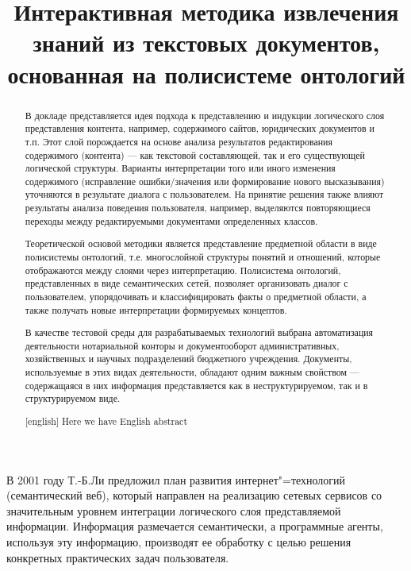 \documentclass[utf8]{../IncArticle}
\title{Интерактивная методика извлечения знаний из текстовых
  документов, основанная на полисистеме онтологий
  \e{Первоначальный заголовок: Методика ПРИОБРЕТЕНИЯ знаний из
    текстовых документов, основанная на анализе ответов пользователя и
    полисистемы онтологий}
}
\date{}
\begin{document}
\begin{abstract}

  В докладе представляется идея подхода к представлению и индукции
  логического слоя представления контента, например, содержимого
  сайтов, юридических документов и т.п. Этот слой порождается на
  основе анализа результатов редактирования содержимого (контента) ---
  как текстовой составляющей, так и его существующей логической
  структуры.  Варианты интерпретации того или иного изменения
  содержимого (исправление ошибки/значения или формирование нового
  высказывания) уточняются в результате диалога с пользователем.  На
  принятие решения также влияют результаты анализа поведения
  пользователя, например, выделяются повторяющиеся переходы между
  редактируемыми документами определенных классов.

  Теоретической основой методики является представление предметной
  области в виде полисистемы онтологий, т.е. многослойной структуры
  понятий и отношений, которые отображаются между слоями через
  интерпретацию.  Полисистема онтологий, представленных в виде
  семантических сетей, позволяет организовать диалог с пользователем,
  упорядочивать и классифицировать факты о предметной области, а также
  получать новые интерпретации формируемых концептов.

  В качестве тестовой среды для разрабатываемых технологий выбрана
  автоматизация деятельности нотариальной конторы и документооборот
  административных, хозяйственных и научных подразделений бюджетного
  учреждения.  Документы, используемые в этих видах деятельности,
  обладают одним важным свойством --- содержащаяся в них информация
  представляется как в неструктурируемом, так и в структурируемом
  виде.

\end{abstract}

\begin{abstract}[english]
  Here we have English abstract
\end{abstract}


\introduction{}

В 2001 году Т.-Б.Ли предложил план развития интернет"=технологий
(семантический веб), который направлен на реализацию сетевых сервисов
со значительным уровнем интеграции логического слоя представляемой
информации.  Информация размечается семантически, а программные агенты,
используя эту информацию, производят ее обработку с целью решения
конкретных практических задач пользователя.
\end{document}
